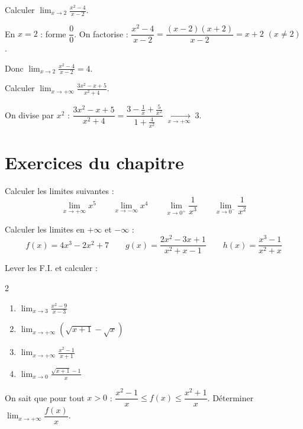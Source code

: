 \begin{exemple}
  Calculer $\displaystyle\lim_{x \to 2} \frac{x^2-4}{x-2}$.

  \medskip
  En $x = 2$ : forme $\dfrac{0}{0}$.
  On factorise : $\dfrac{x^2-4}{x-2} = \dfrac{(x-2)(x+2)}{x-2} = x+2$ \; $(x \neq 2)$.

  Donc $\displaystyle\lim_{x \to 2} \frac{x^2-4}{x-2} = 4$.
\end{exemple}

\begin{exemple}
  Calculer $\displaystyle\lim_{x \to +\infty} \frac{3x^2 - x + 5}{x^2 + 4}$.

  \medskip
  On divise par $x^2$ :
  $\dfrac{3x^2-x+5}{x^2+4}
  = \dfrac{3 - \frac{1}{x} + \frac{5}{x^2}}{1 + \frac{4}{x^2}}
  \;\xrightarrow[x\to+\infty]{}\; 3$.
\end{exemple}
 
\section*{Exercices du chapitre}

\begin{exercice}
  Calculer les limites suivantes :
  \[
    \lim_{x \to +\infty} x^5 \qquad
    \lim_{x \to -\infty} x^4 \qquad
    \lim_{x \to 0^+} \frac{1}{x^3} \qquad
    \lim_{x \to 0^-} \frac{1}{x^2}
  \]
\end{exercice}

\begin{exercice}
  Calculer les limites en $+\infty$ et $-\infty$ :
  \[
    f(x) = 4x^3 - 2x^2 + 7 \qquad
    g(x) = \frac{2x^2 - 3x + 1}{x^2 + x - 1} \qquad
    h(x) = \frac{x^3-1}{x^2+x}
  \]
\end{exercice}

\begin{exercice}
  Lever les F.I. et calculer :
  \begin{multicols}{2}
  \begin{enumerate}
    \item $\displaystyle\lim_{x \to 3} \frac{x^2-9}{x-3}$
    \item $\displaystyle\lim_{x \to +\infty}(\sqrt{x+1}-\sqrt{x})$
    \item $\displaystyle\lim_{x \to +\infty} \frac{x^2-1}{x+1}$
    \item $\displaystyle\lim_{x \to 0} \frac{\sqrt{x+1}-1}{x}$
  \end{enumerate}
  \end{multicols}
\end{exercice}
\begin{exercice}
  On sait que pour tout $x > 0$ :
  $\dfrac{x^2-1}{x} \leq f(x) \leq \dfrac{x^2+1}{x}$.
  D\'{e}terminer $\displaystyle\lim_{x \to +\infty} \dfrac{f(x)}{x}$.
\end{exercice}